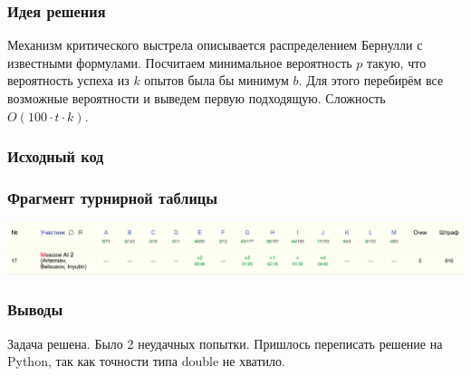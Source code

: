 
\subsubsection*{Идея решения}
Механизм критического выстрела описывается распределением Бернулли с известными формулами. Посчитаем минимальное вероятность $p$ такую, что вероятность успеха из $k$ опытов была бы минимум $b$. Для этого перебирём все возможные вероятности и выведем первую подходящую. Сложность $O(100 \cdot t \cdot k)$.
\subsubsection*{Исходный код}

\subsubsection*{Фрагмент турнирной таблицы}
\includegraphics[width=\textwidth]{images/220424.png}\newline\noindent
\subsubsection*{Выводы}
Задача решена. Было 2 неудачных попытки. Пришлось переписать решение на Python, так как точности типа double не хватило.
\pagebreak
